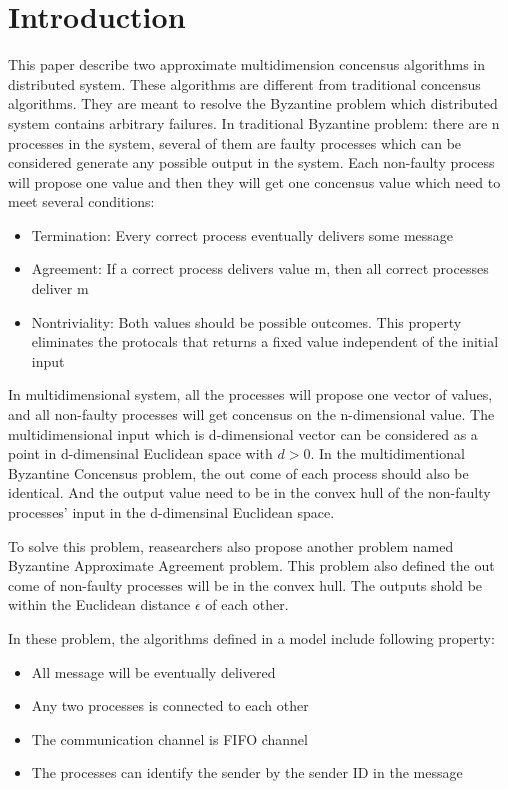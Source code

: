 \section{Introduction}
This paper describe two approximate multidimension concensus algorithms in distributed system.
These algorithms are different from traditional concensus algorithms.  They are meant to resolve
the Byzantine problem which distributed system contains arbitrary failures. In traditional Byzantine
problem: there are n processes in the system, several of them are faulty processes which can be
considered generate any possible output in the system. Each non-faulty process will propose one
value and then they will get one concensus value which need to meet several conditions:

\begin{itemize}

    \item Termination: Every correct process eventually delivers some message

    \item Agreement: If a correct process delivers value m, then all correct processes deliver m

    \item Nontriviality: Both values should be possible outcomes. This property eliminates the
protocals that returns a fixed value independent of the initial input
\end{itemize}

In multidimensional system, all the processes will propose one vector of values, and 
all non-faulty processes will get concensus on the n-dimensional value.  The 
multidimensional input which is d-dimensional vector can be considered as a point in
d-dimensinal Euclidean space with $d > 0$. In the multidimentional Byzantine Concensus
problem, the out come of each process should also be identical. And the output value
need to be in the convex hull of the non-faulty processes' input in the d-dimensinal
Euclidean space.

To solve this problem, reasearchers also propose another problem named Byzantine
Approximate Agreement problem. This problem also defined the out come of non-faulty
processes will be in the convex hull. The outputs shold be within the Euclidean distance
$\epsilon$ of each other.

In these problem, the algorithms defined in a model include following property:

\begin{itemize}

    \item All message will be eventually delivered

    \item Any two processes is connected to each other

    \item The communication channel is FIFO channel

    \item The processes can identify the sender by the sender ID in the message
\end{itemize}

